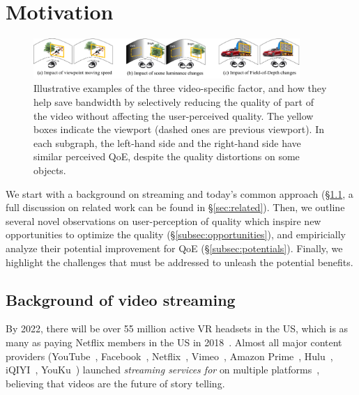 
\section{Motivation}
\label{sec:motivate}

\begin{figure}[t!]
  \centering
  \includegraphics[width=0.9\textwidth]{figures/examples.pdf}
  \caption{Illustrative examples of the three \vr video-specific factor, and how they help save bandwidth by selectively reducing the quality of part of the video without affecting the user-perceived quality. The yellow boxes indicate the viewport (dashed ones are previous viewport). 
In each subgraph, the left-hand side and the right-hand side have similar perceived QoE, despite the quality distortions on some objects.}
  \label{fig:examples}
  \end{figure}

We start with a background on \vrvideo streaming and today's common approach (\S\ref{subsec:background}, a full discussion on related work can be found in \S\ref{sec:related}).
Then, we outline several novel observations on user-perception of \vrvideo quality which inspire new opportunities to optimize the \vrvideo quality (\S\ref{subsec:opportunities}), and empiricially analyze their potential improvement for QoE (\S\ref{subsec:potentials}).
Finally, we highlight the challenges that must be addressed to unleash the potential benefits.


\subsection{Background of \vr video streaming}
\label{subsec:background}

By 2022, there will be over 55 million active VR headsets in the US, which is as many as paying Netflix members in the US in 2018~\cite{https://qz.com/1298512/vr-could-be-as-big-in-the-us-as-netflix-in-five-years-study-shows/}.
Almost all major content providers (YouTube~\cite{??}, Facebook~\cite{??}, Netflix~\cite{??}, Vimeo~\cite{??}, Amazon Prime~\cite{??}, Hulu~\cite{??}, iQIYI~\cite{??}, YouKu~\cite{??}) launched {\em streaming services for \vrvideos} on multiple  platforms~\cite{oculus,samsung,daydreams,etc}, believing that \vr videos are the future of story telling. 

